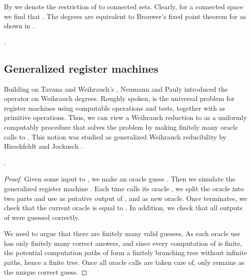 \documentclass{eptcs-modified}
\begin{document}
By  we denote the restriction of  to connected sets. Clearly, for a connected space  we find that . The degrees  are equivalent to Brouwer's fixed point theorem for  as shown in \cite{paulybrattka3}.

\begin{corollary}
.
\end{corollary}

\subsection{Generalized register machines}
Building on Tavana and Weihrauch's \cite{tavana}, Neumann and Pauly \cite{paulyneumann} introduced the operator  on Weihrauch degrees. Roughly spoken,  is the universal problem for register machines using computable operations and tests, together with  as primitive operations. Thus, we can view a Weihrauch reduction to  as a uniformly computably procedure that solves the problem by making finitely many oracle calls to . This notion was studied as generalized Weihrauch reducibility by Hirschfeldt and Jockusch \cite{hirschfeldt,hirschfeldt2}.

\begin{proposition}
\label{prop:cinftydiamond}
.
\begin{proof}
Given some input  to , we make an oracle guess . Then we simulate the generalized register machine . Each time  calls its oracle , we split the oracle into two parts  and use  as putative output of  , and  as new oracle. Once  terminates, we check that the current oracle is equal to . In addition, we check that all outputs of  were guessed correctly.

We need to argue that there are finitely many valid guesses. As each oracle use has only finitely many correct answers, and since every computation of  is finite, the potential computation paths of  form a finitely branching tree without infinite paths, hence a finite tree. Once all oracle calls are taken care of, only  remains as the unique correct guess.
\end{proof}
\end{proposition}
\end{document}
